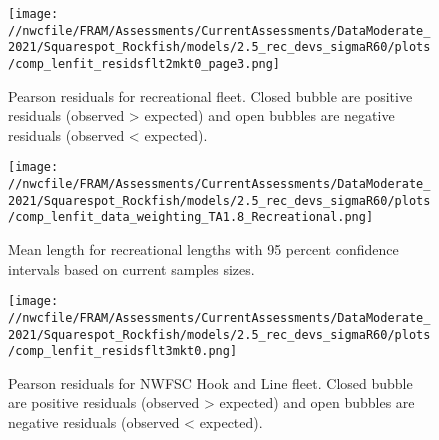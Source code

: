 \documentclass[11pt,
  english,
  a4paper,
]{article}
\begin{document}
\tagmcend\tagstructend


\begin{figure}
\centering
\texttt{[image: //nwcfile/FRAM/Assessments/CurrentAssessments/DataModerate\_2021/Squarespot\_Rockfish/models/2.5\_rec\_devs\_sigmaR60/plots/comp\_lenfit\_residsflt2mkt0\_page3.png]}
\caption{Pearson residuals for recreational fleet. Closed bubble are positive residuals (observed \textgreater{} expected) and open bubbles are negative residuals (observed \textless{} expected).\label{fig:rec-pearson}}
\end{figure}

\tagmcend\tagstructend


\begin{figure}
\centering
\texttt{[image: //nwcfile/FRAM/Assessments/CurrentAssessments/DataModerate\_2021/Squarespot\_Rockfish/models/2.5\_rec\_devs\_sigmaR60/plots/comp\_lenfit\_data\_weighting\_TA1.8\_Recreational.png]}
\caption{Mean length for recreational lengths with 95 percent confidence intervals based on current samples sizes.\label{fig:rec-mean-len-fit}}
\end{figure}

\tagmcend\tagstructend


\begin{figure}
\centering
\texttt{[image: //nwcfile/FRAM/Assessments/CurrentAssessments/DataModerate\_2021/Squarespot\_Rockfish/models/2.5\_rec\_devs\_sigmaR60/plots/comp\_lenfit\_residsflt3mkt0.png]}
\caption{Pearson residuals for NWFSC Hook and Line fleet. Closed bubble are positive residuals (observed \textgreater{} expected) and open bubbles are negative residuals (observed \textless{} expected).\label{fig:hkl-pearson}}
\end{figure}
\end{document}
